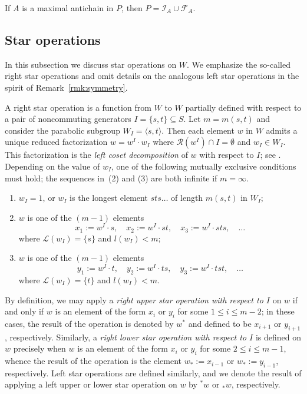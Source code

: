 \documentclass[ALCO,Unicode,published]{cedram}
\newcommand{\cali}{\mathcal{I}}
\newcommand{\calf}{\mathcal{F}}
\newcommand{\call}{\mathcal{L}}
\newcommand{\calr}{\mathcal{R}}
\newcommand{\se}{\subseteq}
\newcommand{\ip}[1]{\langle#1\rangle}
\begin{document}
\begin{lemma}
    \label{lemm:maxAntichain} If $A$ is a maximal antichain in $P$, then $P=\cali_A\cup \calf_A$.
\end{lemma}

\subsection{Star operations} 
\label{sec:StarOperations}

In this subsection we discuss star operations on $W$. We emphasize the so-called right star operations and omit
details on the analogous left star operations in the spirit of Remark~\ref{rmk:symmetry}.  

A right star operation is a function from $W$ to $W$ partially defined with respect to a pair of noncommuting
generators $I=\{s,t\}\se S$. Let $m=m(s,t)$ and consider the parabolic subgroup $W_I=\ip{s,t}$. Then each element
$w$ in $W$ admits a unique reduced factorization $w=w^I \cdot w_I$ where $\calr{(w^I)}\cap I = \emptyset$ and
$w_I\in W_I$.  This factorization is the \emph{left coset decomposition} of $w$ with respect to $I$; see \cite[\S
2.4]{BB}. Depending on the value of $w_I$, one of the following mutually exclusive conditions must hold; the
sequences in~(2) and (3) are both infinite if $m=\infty$.
\begin{enumerate} 
    \item $w_I=1$, or $w_I$ is the longest element $sts\dots$ of length $m(s,t)$ in $W_I$; 
    \item $w$ is one of the $(m-1)$ elements \[ x_1:= w^I\cdot s, \quad x_2:= w^I\cdot st,\quad   x_3:= w^I\cdot
         sts,\quad \dots \] where $\call(w_I)=\{s\}$ and $l(w_I)<m$; 
    \item $w$ is one of the $(m-1)$ elements \[ y_1:= w^I\cdot t,\quad y_2:= w^I\cdot ts,\quad  y_3:= w^I\cdot tst,
         \quad\dots \] where $\call(w_I)=\{t\}$ and $l(w_I)<m$.
\end{enumerate} 

\noindent
By definition, we may apply a \emph{right upper star operation with respect to $I$} on $w$ if and only if $w$ is an
element of the form $x_i$ or $y_i$ for some $1\le i\le m-2$; in these cases, the result of the operation is denoted
by $w^*$ and defined to be $x_{i+1}$ or $y_{i+1}$, respectively. Similarly, a \emph{right lower star operation with
respect to $I$} is defined on $w$ precisely when $w$ is an element of the form $x_i$ or $y_i$ for some $2\le i\le
m-1$, whence the result of the operation is the element $w_*:=x_{i-1}$ or $w_*:=y_{i-1}$, respectively.  Left star
operations are defined similarly, and we denote the result of applying a left upper or lower star operation on $w$
by ${}^* w$ or ${}_* w$, respectively. 
\end{document}
